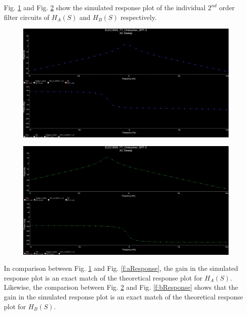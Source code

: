 \documentclass[hidelinks]{article}
\begin{document}
	\pagebreak
	\noindent Fig. \ref{f:stageA_gain} and Fig. \ref{f:stageB_gain} show the simulated response plot of the individual $2^{nd}$ order filter circuits of $H_A(S)$ and $H_B(S)$ respectively.
	\begin{figure}[htbp]
		\centering
		\includegraphics[width=0.6\textheight]{stageA_gain.png}
		\label{f:stageA_gain}
	\end{figure}	
	\begin{figure}[htbp]
		\centering
		\includegraphics[width=0.6\textheight]{stageB_gain.png}
		\label{f:stageB_gain}
	\end{figure}	

	\noindent In comparison between Fig. \ref{f:stageA_gain} and Fig. \ref{f:aResponse}, the gain in the simulated response plot is an exact match of the theoretical response plot for $H_A(S)$. 
	Likewise, the comparison between Fig. \ref{f:stageB_gain} and Fig. \ref{f:bResponse} shows that the gain in the simulated response plot is an exact match of the theoretical response plot for $H_B(S)$.
	
\end{document}
